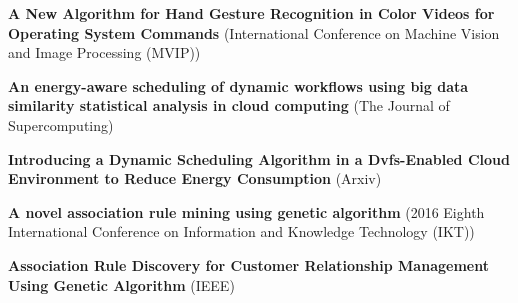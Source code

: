 
\begin{scholarship}
					{\textbf{A New Algorithm for Hand Gesture Recognition in Color Videos for Operating System Commands}  (International Conference on Machine Vision and Image Processing (MVIP))}
\end{scholarship}

\begin{scholarship}
					{\textbf{An energy-aware scheduling of dynamic workflows using big data similarity statistical analysis in cloud computing} (The Journal of Supercomputing)}
\end{scholarship}

\begin{scholarship}
					{\textbf{ Introducing a Dynamic Scheduling Algorithm in a Dvfs-Enabled Cloud Environment to Reduce Energy Consumption} (Arxiv)}
\end{scholarship}

\begin{scholarship}
					{\textbf{A novel association rule mining using genetic algorithm }(2016 Eighth International Conference on Information and Knowledge Technology (IKT))}
\end{scholarship}

\begin{scholarship}
					{\textbf{Association Rule Discovery for Customer Relationship Management Using Genetic Algorithm} (IEEE)}
\end{scholarship}
